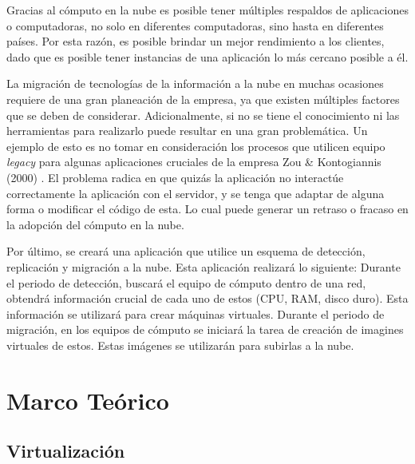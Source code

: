 \documentclass[12pt,twoside]{reedthesis}
\theoremstyle{definition}
\theoremstyle{definition}
\theoremstyle{definition}
\theoremstyle{remark}
\begin{document}
Gracias al cómputo en la nube es posible tener múltiples respaldos de
aplicaciones o computadoras, no solo en diferentes computadoras, sino
hasta en diferentes países. Por esta razón, es posible brindar un mejor
rendimiento a los clientes, dado que es posible tener instancias de una
aplicación lo más cercano posible a él.

La migración de tecnologías de la información a la nube en muchas
ocasiones requiere de una gran planeación de la empresa, ya que existen
múltiples factores que se deben de considerar. Adicionalmente, si no se
tiene el conocimiento ni las herramientas para realizarlo puede resultar
en una gran problemática. Un ejemplo de esto es no tomar en
consideración los procesos que utilicen equipo \emph{legacy} para
algunas aplicaciones cruciales de la empresa Zou \& Kontogiannis (2000)
. El problema radica en que quizás la aplicación no interactúe
correctamente la aplicación con el servidor, y se tenga que adaptar de
alguna forma o modificar el código de esta. Lo cual puede generar un
retraso o fracaso en la adopción del cómputo en la nube.

Por último, se creará una aplicación que utilice un esquema de
detección, replicación y migración a la nube. Esta aplicación realizará
lo siguiente: Durante el periodo de detección, buscará el equipo de
cómputo dentro de una red, obtendrá información crucial de cada uno de
estos (CPU, RAM, disco duro). Esta información se utilizará para crear
máquinas virtuales. Durante el periodo de migración, en los equipos de
cómputo se iniciará la tarea de creación de imagines virtuales de estos.
Estas imágenes se utilizarán para subirlas a la nube.

\hypertarget{ref_labels}{%
\chapter{Marco Teórico}\label{ref_labels}}

\hypertarget{virtualizacion}{%
\section{Virtualización}\label{virtualizacion}}
\end{document}
